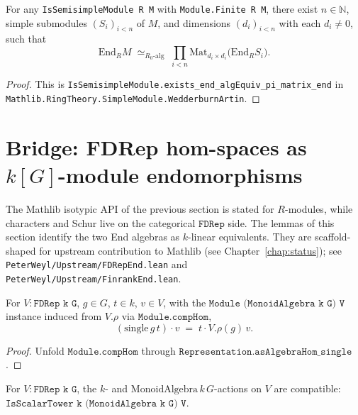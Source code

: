 \begin{corollary}
  \label{cor:moduleForm-PeterWeyl-Mathlib}
  \mathlibok
  \leanok
  For any \texttt{IsSemisimpleModule R M} with \texttt{Module.Finite R M},
  there exist $n \in \mathbb N$, simple submodules
  $(S_i)_{i < n}$ of $M$, and dimensions $(d_i)_{i < n}$ with each
  $d_i \ne 0$, such that
  \[
     \mathrm{End}_R M \;\simeq_{R_0\text{-alg}}\;
     \prod_{i < n} \mathrm{Mat}_{d_i \times d_i}\bigl(\mathrm{End}_R S_i\bigr).
  \]
\end{corollary}

\begin{proof}\leanok{}
  This is \texttt{IsSemisimpleModule.exists\_end\_algEquiv\_pi\_matrix\_end}
  in \texttt{Mathlib.RingTheory.SimpleModule.WedderburnArtin}.
\end{proof}

\section{Bridge: FDRep hom-spaces as $k[G]$-module endomorphisms}

The Mathlib isotypic API of the previous section is stated for
$R$-modules, while characters and Schur live on the categorical
$\texttt{FDRep}$ side.  The lemmas of this section identify the two
End algebras as $k$-linear equivalents.  They are scaffold-shaped for
upstream contribution to Mathlib (see Chapter~\ref{chap:status}); see
\texttt{PeterWeyl/Upstream/FDRepEnd.lean} and
\texttt{PeterWeyl/Upstream/FinrankEnd.lean}.

\begin{lemma}
  \label{lem:single-smul}
  \leanok
  For $V : \texttt{FDRep k G}$, $g \in G$, $t \in k$, $v \in V$, with the
  $\texttt{Module (MonoidAlgebra k G) V}$ instance induced from $V.\rho$
  via $\texttt{Module.compHom}$,
  \[
     (\mathrm{single}\,g\,t)\cdot v \;=\; t\cdot V.\rho(g)\,v.
  \]
\end{lemma}

\begin{proof}\leanok
  Unfold $\texttt{Module.compHom}$ through
  $\texttt{Representation.asAlgebraHom\_single}$.
\end{proof}

\begin{lemma}
  \label{lem:scalar-tower-fdrep}
  \leanok
  For $V : \texttt{FDRep k G}$, the $k$- and $\mathrm{MonoidAlgebra}\,k\,G$-actions
  on $V$ are compatible: $\texttt{IsScalarTower k (MonoidAlgebra k G) V}$.
\end{lemma}

